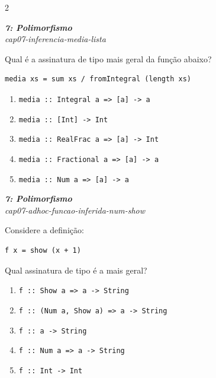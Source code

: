 \documentclass[a4paper,10pt,brazil]{article}
\begin{document}
\begin{multicols}{2}
\begin{flushright}
  \footnotesize
  \textit{\textbf{7: Polimorfismo}}\\
  \textit{cap07-inferencia-media-lista}\\

\end{flushright}
Qual é a assinatura de tipo mais geral da função abaixo?

\begin{verbatim}
media xs = sum xs / fromIntegral (length xs)
\end{verbatim}

\begin{enumerate}
  \item \texttt{media :: Integral a => [a] -> a}
  \item \texttt{media :: [Int] -> Int}
  \item \texttt{media :: RealFrac a => [a] -> Int}
  \item \texttt{media :: Fractional a => [a] -> a}
  \item \texttt{media :: Num a => [a] -> a}

\end{enumerate}

\begin{flushright}
  \footnotesize
  \textit{\textbf{7: Polimorfismo}}\\
  \textit{cap07-adhoc-funcao-inferida-num-show}\\

\end{flushright}
Considere a definição:

\begin{verbatim}
f x = show (x + 1)
\end{verbatim}

Qual assinatura de tipo é a mais geral?

\begin{enumerate}
  \item \texttt{f :: Show a => a -> String}
  \item \texttt{f :: (Num a, Show a) => a -> String}
  \item \texttt{f :: a -> String}
  \item \texttt{f :: Num a => a -> String}
  \item \texttt{f :: Int -> Int}


\end{enumerate}
\end{multicols}
\end{document}
